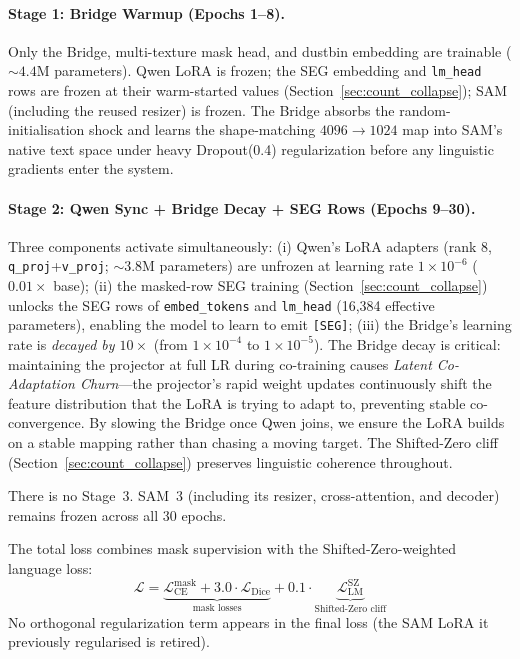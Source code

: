 \documentclass{article}
\begin{document}
\paragraph{Stage 1: Bridge Warmup (Epochs 1--8).}
Only the Bridge, multi-texture mask head, and dustbin embedding are trainable (${\sim}4.4$M parameters). Qwen LoRA is frozen; the SEG embedding and \texttt{lm\_head} rows are frozen at their warm-started values (Section~\ref{sec:count_collapse}); SAM (including the reused resizer) is frozen. The Bridge absorbs the random-initialisation shock and learns the shape-matching $4096 \to 1024$ map into SAM's native text space under heavy Dropout(0.4) regularization before any linguistic gradients enter the system.

\paragraph{Stage 2: Qwen Sync + Bridge Decay + SEG Rows (Epochs 9--30).}
Three components activate simultaneously: (i) Qwen's LoRA adapters (rank 8, \texttt{q\_proj}+\texttt{v\_proj}; ${\sim}3.8$M parameters) are unfrozen at learning rate $1 \times 10^{-6}$ ($0.01\times$ base); (ii) the masked-row SEG training (Section~\ref{sec:count_collapse}) unlocks the SEG rows of \texttt{embed\_tokens} and \texttt{lm\_head} (16{,}384 effective parameters), enabling the model to learn to emit \texttt{[SEG]}; (iii) the Bridge's learning rate is \emph{decayed by $10\times$} (from $1 \times 10^{-4}$ to $1 \times 10^{-5}$). The Bridge decay is critical: maintaining the projector at full LR during co-training causes \emph{Latent Co-Adaptation Churn}---the projector's rapid weight updates continuously shift the feature distribution that the LoRA is trying to adapt to, preventing stable co-convergence. By slowing the Bridge once Qwen joins, we ensure the LoRA builds on a stable mapping rather than chasing a moving target. The Shifted-Zero cliff (Section~\ref{sec:count_collapse}) preserves linguistic coherence throughout.

There is no Stage~3. SAM~3 (including its resizer, cross-attention, and decoder) remains frozen across all 30 epochs.

The total loss combines mask supervision with the Shifted-Zero-weighted language loss:
\begin{equation}
    \mathcal{L} = \underbrace{\mathcal{L}_{\text{CE}}^{\text{mask}} + 3.0 \cdot \mathcal{L}_{\text{Dice}}}_{\text{mask losses}} + 0.1 \cdot \underbrace{\mathcal{L}_{\text{LM}}^{\text{SZ}}}_{\text{Shifted-Zero cliff}}
\end{equation}
No orthogonal regularization term appears in the final loss (the SAM LoRA it previously regularised is retired).
\end{document}
